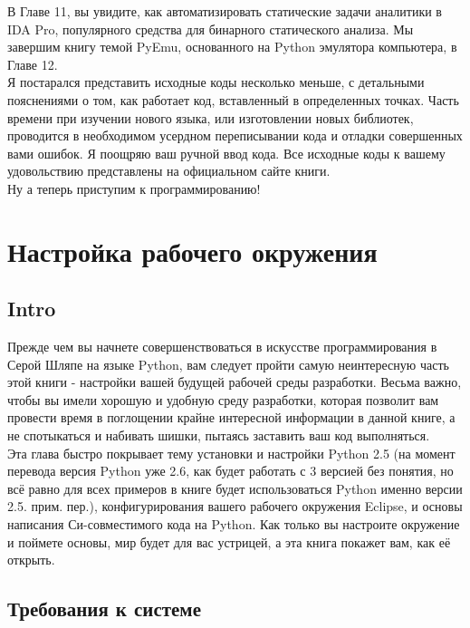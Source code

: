 \documentclass[12pt, a4paper, oneside]{book}
\begin{document}
В Главе 11, вы увидите, как автоматизировать статические задачи аналитики в IDA Pro, популярного средства для бинарного статического анализа. Мы завершим книгу темой PyEmu, основанного на Python эмулятора компьютера, в Главе 12.\\

Я постарался представить исходные коды несколько меньше, с детальными пояснениями о том, как работает код, вставленный в определенных точках. Часть времени при изучении нового языка, или изготовлении новых библиотек, проводится в необходимом усердном переписывании кода и отладки совершенных вами ошибок. Я поощряю ваш ручной ввод кода. Все исходные коды к вашему удовольствию представлены на официальном сайте книги.\\

Ну а теперь приступим к программированию!
\newpage

\tableofcontents

\chapter{Настройка рабочего окружения}
\setcounter{subsection}{0}
\section*{Intro}

Прежде чем вы начнете совершенствоваться в искусстве программирования в Серой Шляпе на языке Python, вам следует пройти самую неинтересную часть этой книги - настройки вашей будущей рабочей среды разработки. Весьма важно, чтобы вы имели хорошую и удобную среду разработки, которая позволит вам провести время в поглощении крайне интересной информации в данной книге, а не спотыкаться и набивать шишки, пытаясь заставить ваш код выполняться.\\

Эта глава быстро покрывает тему установки и настройки Python 2.5 (на момент перевода версия Python уже 2.6, как будет работать с 3 версией без понятия, но всё равно для всех примеров в книге будет использоваться Python именно версии 2.5. прим. пер.), конфигурирования вашего рабочего окружения Eclipse, и основы написания Си-совместимого кода на Python. Как только вы настроите окружение и поймете основы, мир будет для вас устрицей, а эта книга покажет вам, как её открыть.\\

\section{Требования к системе}
\end{document}
